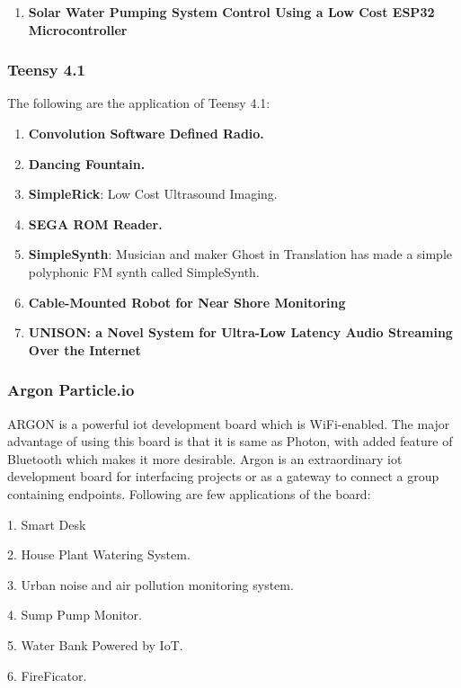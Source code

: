\documentclass[a4paper,11pt]{article}
\begin{document}
\begin{iotsolution}
\begin{enumerate}
\item \textbf{Solar Water Pumping System Control Using a Low Cost ESP32 Microcontroller }\cite{biswas2018solar}
\end{enumerate}

\subsubsection*{Teensy 4.1}
The following are the application of Teensy 4.1\cite{[A8]}:
\begin{enumerate}
\item \textbf{Convolution Software Defined Radio.} 

\item \textbf{Dancing Fountain.} 

\item \textbf{ SimpleRick}: Low Cost Ultrasound Imaging.

\item \textbf{SEGA ROM Reader.} 

\item \textbf{SimpleSynth}: Musician and maker Ghost in Translation has made a simple polyphonic FM synth called SimpleSynth.
\item \textbf{Cable-Mounted Robot for Near Shore Monitoring  }\cite{snow2020design1}
\item \textbf{UNISON: a Novel System for Ultra-Low Latency Audio Streaming Over the Internet }\cite{werner2021unison}
\end{enumerate}

\subsubsection*{Argon Particle.io}
ARGON is a powerful iot development board which is WiFi-enabled. The major advantage of using this board is that it is same as Photon, with added feature of Bluetooth which makes it more desirable. Argon is an extraordinary iot development board for interfacing projects or as a gateway to connect a group containing endpoints.
Following are few applications of the  board:

1.  Smart Desk 

2.  House Plant Watering System.

3.  Urban noise and air pollution monitoring system.

4.  Sump Pump Monitor.

5.  Water Bank Powered by IoT.

6. FireFicator.

\subsubsection*{}


\end{iotsolution}


% 

\end{document}
